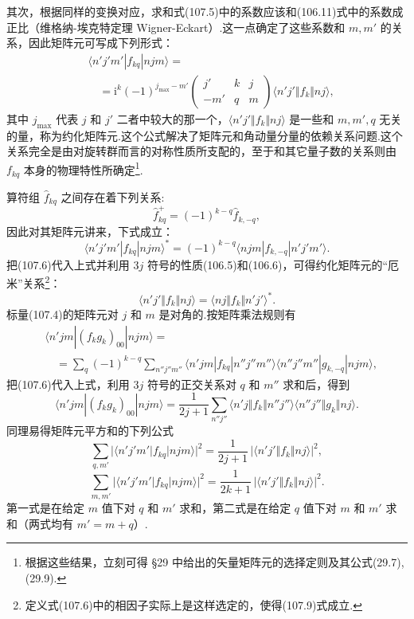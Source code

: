其次，根据同样的变换对应，求和式(107.5)中的系数应该和(106.11)式中的系数成正比（维格纳-埃克特定理 Wigner-Eckart）.这一点确定了这些系数和 $m,m'$ 的关系，因此矩阵元可写成下列形式：
\begin{equation}
\begin{aligned}
  &\langle n'j'm'|f_{kq}|njm\rangle=\\
  &\quad=\mathrm{i}^k(-1)^{j_{\max}-m'}
  \left(\begin{array}{ccc}j'&k&j\\-m'&q&m\end{array}\right)
  \langle n'j'\Vert f_k\Vert nj\rangle,
\end{aligned}
\end{equation}
其中 $j_{\max}$ 代表 $j$ 和 $j'$ 二者中较大的那一个，$\langle n'j'\Vert f_k\Vert nj\rangle$ 是一些和 $m,m',q$ 无关的量，称为约化矩阵元.这个公式解决了矩阵元和角动量分量的依赖关系问题.这个关系完全是由对旋转群而言的对称性质所支配的，至于和其它量子数的关系则由 $f_{kq}$ 本身的物理特性所确定\footnote{根据这些结果，立刻可得 §29 中给出的矢量矩阵元的选择定则及其公式(29.7),(29.9).}.

算符组 $\hat{f}_{kq}$ 之间存在着下列关系:
\begin{equation}
  \hat{f}_{kq}^{+}=(-1)^{k-q}\hat{f}_{k,-q},
\end{equation}
因此对其矩阵元讲来，下式成立：
\begin{equation}
  \langle n'j'm'|f_{kq}|njm\rangle^{*}
  =(-1)^{k-q}\langle njm|f_{k,-q}|n'j'm'\rangle.
\end{equation}
把(107.6)代入上式并利用 $3j$ 符号的性质(106.5)和(106.6)，可得约化矩阵元的“厄米”关系\footnote{定义式(107.6)中的相因子实际上是这样选定的，使得(107.9)式成立.}：
\begin{equation}
  \langle n'j'\Vert f_k\Vert nj\rangle
  =\langle nj\Vert f_k\Vert n'j'\rangle^{*}.
\end{equation}
标量(107.4)的矩阵元对 $j$ 和 $m$ 是对角的.按矩阵乘法规则有
\begin{equation*}
\begin{aligned}
  &\langle n'jm|(f_kg_k)_{00}|njm\rangle=\\
  &\quad=\sum_q(-1)^{k-q}\sum_{n''j''m''}
  \langle n'jm|f_{kq}|n''j''m''\rangle
  \langle n''j''m''|g_{k,-q}|njm\rangle,
\end{aligned}
\end{equation*}
把(107.6)代入上式，利用 $3j$ 符号的正交关系对 $q$ 和 $m''$ 求和后，得到
\begin{equation}
  \langle n'jm|(f_kg_k)_{00}|njm\rangle
  =\frac{1}{2j+1}\sum_{n''j''}
  \langle n'j\Vert f_k\Vert n''j''\rangle
  \langle n''j''\Vert g_k\Vert nj\rangle.
\end{equation}
同理易得矩阵元平方和的下列公式
\begin{equation}
  \sum_{q,m'}|\langle n'j'm'|f_{kq}|njm\rangle|^2
  =\frac{1}{2j+1}\,|\langle n'j'\Vert f_k\Vert nj\rangle|^2,
\end{equation}
\begin{equation}
  \sum_{m,m'}|\langle n'j'm'|f_{kq}|njm\rangle|^2
  =\frac{1}{2k+1}\,|\langle n'j'\Vert f_k\Vert nj\rangle|^2.
\end{equation}
第一式是在给定 $m$ 值下对 $q$ 和 $m'$ 求和，第二式是在给定 $q$ 值下对 $m$ 和 $m'$ 求和（两式均有 $m'=m+q$）.

